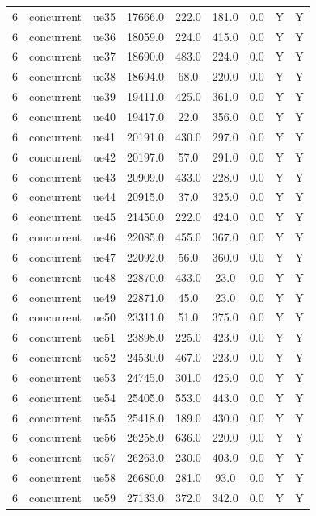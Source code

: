 \begin{table}[ht]
\begin{tabular}{|c|c|c|c|c|c|c|c|c|}
6 & concurrent & ue35 & 17666.0 & 222.0 & 181.0 & 0.0 & Y & Y \\
6 & concurrent & ue36 & 18059.0 & 224.0 & 415.0 & 0.0 & Y & Y \\
6 & concurrent & ue37 & 18690.0 & 483.0 & 224.0 & 0.0 & Y & Y \\
6 & concurrent & ue38 & 18694.0 & 68.0 & 220.0 & 0.0 & Y & Y \\
6 & concurrent & ue39 & 19411.0 & 425.0 & 361.0 & 0.0 & Y & Y \\
6 & concurrent & ue40 & 19417.0 & 22.0 & 356.0 & 0.0 & Y & Y \\
6 & concurrent & ue41 & 20191.0 & 430.0 & 297.0 & 0.0 & Y & Y \\
6 & concurrent & ue42 & 20197.0 & 57.0 & 291.0 & 0.0 & Y & Y \\
6 & concurrent & ue43 & 20909.0 & 433.0 & 228.0 & 0.0 & Y & Y \\
6 & concurrent & ue44 & 20915.0 & 37.0 & 325.0 & 0.0 & Y & Y \\
6 & concurrent & ue45 & 21450.0 & 222.0 & 424.0 & 0.0 & Y & Y \\
6 & concurrent & ue46 & 22085.0 & 455.0 & 367.0 & 0.0 & Y & Y \\
6 & concurrent & ue47 & 22092.0 & 56.0 & 360.0 & 0.0 & Y & Y \\
6 & concurrent & ue48 & 22870.0 & 433.0 & 23.0 & 0.0 & Y & Y \\
6 & concurrent & ue49 & 22871.0 & 45.0 & 23.0 & 0.0 & Y & Y \\
6 & concurrent & ue50 & 23311.0 & 51.0 & 375.0 & 0.0 & Y & Y \\
6 & concurrent & ue51 & 23898.0 & 225.0 & 423.0 & 0.0 & Y & Y \\
6 & concurrent & ue52 & 24530.0 & 467.0 & 223.0 & 0.0 & Y & Y \\
6 & concurrent & ue53 & 24745.0 & 301.0 & 425.0 & 0.0 & Y & Y \\
6 & concurrent & ue54 & 25405.0 & 553.0 & 443.0 & 0.0 & Y & Y \\
6 & concurrent & ue55 & 25418.0 & 189.0 & 430.0 & 0.0 & Y & Y \\
6 & concurrent & ue56 & 26258.0 & 636.0 & 220.0 & 0.0 & Y & Y \\
6 & concurrent & ue57 & 26263.0 & 230.0 & 403.0 & 0.0 & Y & Y \\
6 & concurrent & ue58 & 26680.0 & 281.0 & 93.0 & 0.0 & Y & Y \\
6 & concurrent & ue59 & 27133.0 & 372.0 & 342.0 & 0.0 & Y & Y \\

\end{tabular}
\end{table}
